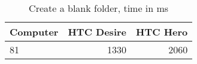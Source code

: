 \begin{table}
  \centering
  \caption{Create a blank folder, time in ms}
  \begin{tabular}{ | l | r | r |}
    \hline
   \textbf{Computer} & \textbf{HTC Desire} & \textbf{HTC Hero} \\ \hline
    81  &1330     &2060    \\ \hline
  \end{tabular}
  \label{tbl:folder:createblank}
\end{table}
